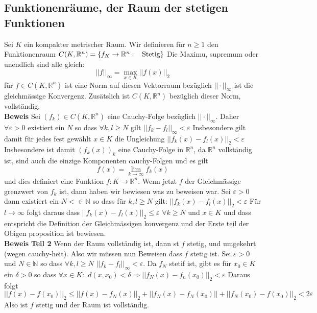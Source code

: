 \documentclass{article}
\newcommand{\smspc}{\hspace{0.3cm}}
\newcommand{\beweis}{\\\textbf{Beweis }}
\begin{document}
\subsection*{Funktionenräume, der Raum der stetigen Funktionen}
Sei $K$ ein kompakter metrischer Raum. Wir definieren für $n\ge 1$ den Funktionenraum $C(K,\mathbb{R}^n)=\left\lbrace f_K \rightarrow \mathbb{R}^n: \smspc \text{Stetig}\right\rbrace$ Die Maximu, supremum oder unendlich sind alle gleich:
\[||f||_{\infty}=\max_{x\in K}||f(x)||_2\]
für $f\in C(K, \mathbb{R}^n)$ ist eine Norm auf diesen Vektorraum bezüglich $||\cdot||_\infty$ ist die gleichmässige Konvergenz. Zusätslich ist $C(K, \mathbb{R}^n)$ bezüglich dieser Norm, vollständig.
\beweis Sei $(f_k)\in C(K, \mathbb{R}^n)$ eine Cauchy-Folge bezüglich $||\cdot||_\infty$. Daher $\forall \varepsilon>0$ existiert ein $N$ so dass $\forall k,l\ge N$ gilt $||f_k-f_l||_\infty < \varepsilon$ Insbesondere gilt damit für jedes fest gewählt $x\in K$ die Ungleichung $||f_k(x)-f_l(x)||_2< \varepsilon$
Insbesondere ist damit $(f_k(x))_k$ eine Cauchy-Folge in $\mathbb{R}^n$, da $\mathbb{R}^n$ vollständig ist, sind auch die einzige Komponenten cauchy-Folgen und es gilt 
\[f(x)=\lim_{k\rightarrow\infty}f_k(x)\] und dies definiert eine Funktion $f:K \rightarrow \mathbb{R}^n$. Wenn jetzt $f$ der Gleichmässige grenzwert von $f_k$ ist, dann haben wir bewiesen was zu beweisen war.
\newline Sei $\varepsilon > 0$ dann existiert ein $N<\in \mathbb{N}$ so dass für $k,l\ge N$ gilt: $||f_k(x)-f_l(x)||_2< \varepsilon$ Für $l \rightarrow\infty$ folgt daraus dass $||f_k(x)-f_l(x)||_2\le \varepsilon$ $\forall k\ge N$ und $x\in K$ und dass entspricht die Definition der Gleichmässigen konvergenz und der Erste teil der Obigen proposition ist bewiesen.
\beweis \textbf{Teil 2} Wenn der Raum vollständig ist, dann st $f$ stetig, und umgekehrt (wegen cauchy-heit). Also wir müssen nun Beweisen dass $f$ stetig ist.
\newline Sei $\varepsilon >0$ und $N\in \mathbb{N}$ so dass $\forall k,l\ge N$ $||f_k-f_l||_{\infty}< \varepsilon$. Da $f_N$ stetif ist, gibt es für $x_0\in K$ ein $\delta>0$ so dass $\forall x\in K:$ $d(x,x_0)<\delta \Rightarrow ||f_N(x)-f_n(x_0)||_2< \varepsilon$ Daraus folgt $||f(x)-f(x_0)||_2 \le ||f(x)-f_N(x)||_2+||f_N(x)-f_N(x_0)||+||f_N(x_0)-f(x_0)||_2< 2 \varepsilon$ Also ist $f$ stetig und der Raum ist vollständig.
\end{document}
